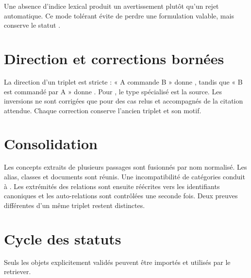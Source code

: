 Une absence d'indice lexical produit un avertissement plutôt qu'un rejet automatique. Ce mode tolérant évite de perdre une formulation valable, mais conserve le statut .

\section{Direction et corrections bornées}

La direction d'un triplet est stricte : « A commande B » donne , tandis que « B est commandé par A » donne . Pour , le type spécialisé est la source. Les inversions ne sont corrigées que pour des cas relus et accompagnés de la citation attendue. Chaque correction conserve l'ancien triplet et son motif.

\section{Consolidation}

Les concepts extraits de plusieurs passages sont fusionnés par nom normalisé. Les alias, classes et documents sont réunis. Une incompatibilité de catégories conduit à . Les extrémités des relations sont ensuite réécrites vers les identifiants canoniques et les auto-relations sont contrôlées une seconde fois. Deux preuves différentes d'un même triplet restent distinctes.

\section{Cycle des statuts}

\begin{center}
\end{center}

Seuls les objets explicitement validés peuvent être importés et utilisés par le retriever.

